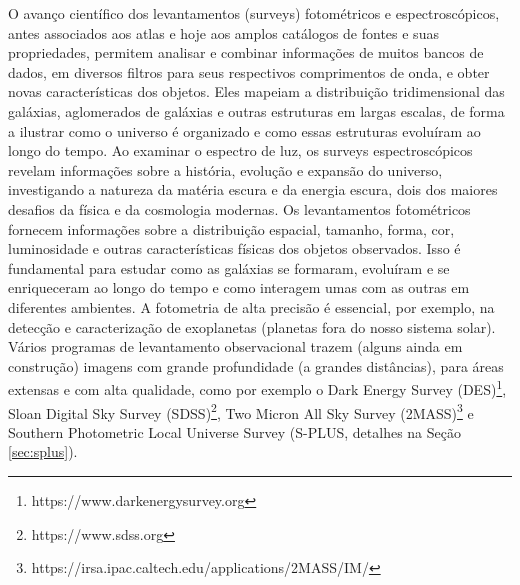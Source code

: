 O avanço científico dos levantamentos (surveys) fotométricos e espectroscópicos, antes associados aos atlas e hoje aos amplos catálogos de fontes e suas propriedades, permitem analisar e combinar informações de muitos bancos de dados, em diversos filtros para seus respectivos comprimentos de onda, e obter novas características dos objetos. Eles mapeiam a distribuição tridimensional das galáxias, aglomerados de galáxias e outras estruturas em largas escalas, de forma a ilustrar como o universo é organizado e como essas estruturas evoluíram ao longo do tempo. Ao examinar o espectro de luz, os surveys espectroscópicos revelam informações sobre a história, evolução e expansão do universo, investigando a natureza da matéria escura e da energia escura, dois dos maiores desafios da física e da cosmologia modernas. Os levantamentos fotométricos fornecem informações sobre a distribuição espacial, tamanho, forma, cor, luminosidade e outras características físicas dos objetos observados. Isso é fundamental para estudar como as galáxias se formaram, evoluíram e se enriqueceram ao longo do tempo e como interagem umas com as outras em diferentes ambientes. A fotometria de alta precisão é essencial, por exemplo, na detecção e caracterização de exoplanetas (planetas fora do nosso sistema solar). Vários programas de levantamento observacional trazem (alguns ainda em construção) imagens com grande profundidade (a grandes distâncias), para áreas extensas e com alta qualidade, como por exemplo o Dark Energy Survey (DES)\footnote{https://www.darkenergysurvey.org}, Sloan Digital Sky Survey (SDSS)\footnote{https://www.sdss.org}, Two Micron All Sky Survey (2MASS)\footnote{https://irsa.ipac.caltech.edu/applications/2MASS/IM/} e Southern Photometric Local Universe Survey (S-PLUS, detalhes na Seção \ref{sec:splus}). 

